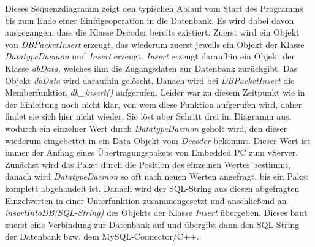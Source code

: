 \documentclass[fontsize = 12pt, paper = a4]{scrreprt}
\begin{document}
Dieses Sequenzdiagramm zeigt den typischen Ablauf vom Start des Programms bis zum Ende einer Einfügeoperation in die Datenbank.
Es wird dabei davon ausgegangen, dass die Klasse Decoder bereits existiert.
Zuerst wird ein Objekt von \textit{DBPacketInsert} erzeugt, das wiederum zuerst jeweils ein Objekt der Klasse \textit{DatatypeDaemon} und \textit{Insert} erzeugt. \textit{Insert} erzeugt daraufhin ein Objekt der Klasse \textit{dbData}, welches ihm die Zugangsdaten zur Datenbank zurückgibt. Das Objekt \textit{dbData} wird daraufhin gelöscht. Danach wird bei \textit{DBPacketInsert} die Memberfunktion \textit{db\_insert()} aufgerufen. Leider war zu diesem Zeitpunkt wie in der Einleitung noch nicht klar, von wem diese Funktion aufgerufen wird, daher findet sie sich hier nicht wieder. Sie löst aber Schritt drei im Diagramm aus, wodurch ein einzelner Wert durch \textit{DatatypeDaemon} geholt wird, den dieser wiederum eingebettet in ein Data-Objekt vom \textit{Decoder} bekommt. Dieser Wert ist immer der Anfang eines Übertragungspakets von Embedded PC zum vServer. Zunächst wird das Paket durch die Position des einzelnen Wertes bestimmt, danach wird \textit{DatatypeDaemon} so oft nach neuen Werten angefragt, bis ein Paket komplett abgehandelt ist. Danach wird der SQL-String aus diesen abgefragten Einzelwerten in einer Unterfunktion zusammengesetzt und anschließend an \textit{insertIntoDB(SQL-String)} des Objekts der Klasse \textit{Insert} übergeben. Dieses baut zuerst eine Verbindung zur Datenbank auf und übergibt dann den SQL-String der Datenbank bzw. dem MySQL-Connector/C++.


\newpage %
\end{document}
